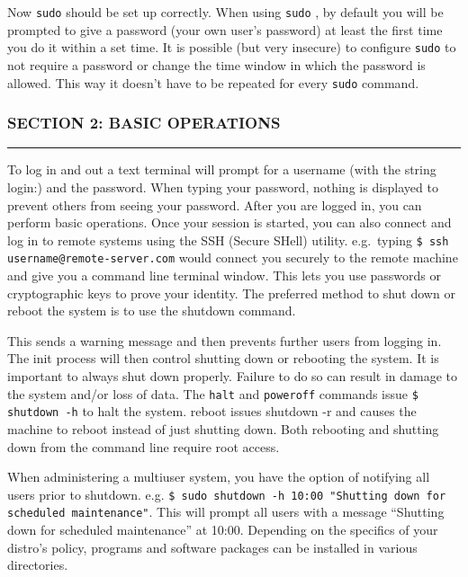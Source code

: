 Now \texttt{sudo} should be set up correctly. When using \texttt{sudo} ,
by default you will be prompted to give a password (your own user's
password) at least the first time you do it within a set time. It is
possible (but very insecure) to configure \texttt{sudo} to not require a
password or change the time window in which the password is allowed.
This way it doesn't have to be repeated for every \texttt{sudo} command.

\subsubsection{SECTION 2: BASIC
OPERATIONS}\label{section-2-basic-operations-1}

\begin{center}\rule{3in}{0.4pt}\end{center}

To log in and out a text terminal will prompt for a username (with the
string login:) and the password. When typing your password, nothing is
displayed to prevent others from seeing your password. After you are
logged in, you can perform basic operations. Once your session is
started, you can also connect and log in to remote systems using the SSH
(Secure SHell) utility. e.g.~typing
\texttt{\$ ssh username@remote-server.com} would connect you securely to
the remote machine and give you a command line terminal window. This
lets you use passwords or cryptographic keys to prove your identity. The
preferred method to shut down or reboot the system is to use the
shutdown command.

This sends a warning message and then prevents further users from
logging in. The init process will then control shutting down or
rebooting the system. It is important to always shut down properly.
Failure to do so can result in damage to the system and/or loss of data.
The \texttt{halt} and \texttt{poweroff} commands issue
\texttt{\$ shutdown -h} to halt the system. reboot issues shutdown -r
and causes the machine to reboot instead of just shutting down. Both
rebooting and shutting down from the command line require root access.

When administering a multiuser system, you have the option of notifying
all users prior to shutdown. e.g.
\texttt{\$ sudo shutdown -h 10:00 "Shutting down for scheduled maintenance"}.
This will prompt all users with a message ``Shutting down for scheduled
maintenance'' at 10:00. Depending on the specifics of your distro's
policy, programs and software packages can be installed in various
directories.

